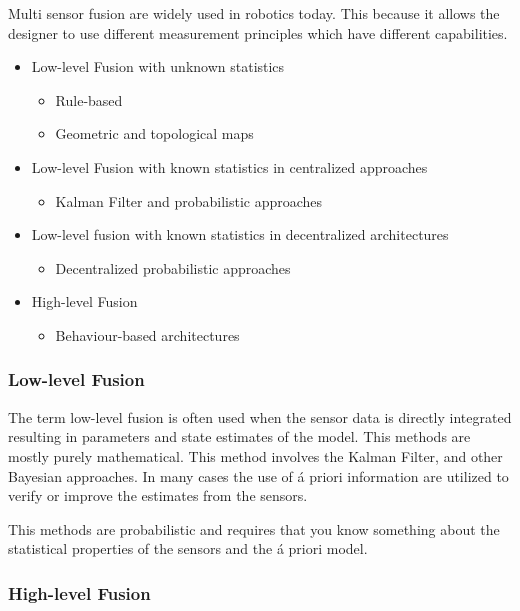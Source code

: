 Multi sensor fusion are widely used in robotics today. This because it allows the designer
to use different measurement principles which have different capabilities. 


\begin{itemize}
    \item Low-level Fusion with unknown statistics
        \begin{itemize}
            \item Rule-based
            \item Geometric and topological maps
        \end{itemize}
    \item Low-level Fusion with known statistics in centralized approaches
        \begin{itemize}
            \item Kalman Filter and probabilistic approaches
        \end{itemize}
    \item Low-level fusion with known statistics in decentralized architectures
        \begin{itemize}
            \item Decentralized probabilistic approaches
        \end{itemize}
    \item High-level Fusion
        \begin{itemize}
            \item Behaviour-based architectures
        \end{itemize}
\end{itemize}


\subsubsection{Low-level Fusion}
The term low-level fusion is often used when the sensor data is directly integrated
resulting in parameters and state estimates of the model. This methods are mostly purely
mathematical. This method involves the Kalman Filter, and other Bayesian approaches. In
many cases the use of \'a priori information are utilized to verify or improve the
estimates from the sensors.

This methods are probabilistic and requires that you know something about the
statistical properties of the sensors and the \'a priori model. 


\subsubsection{High-level Fusion}



